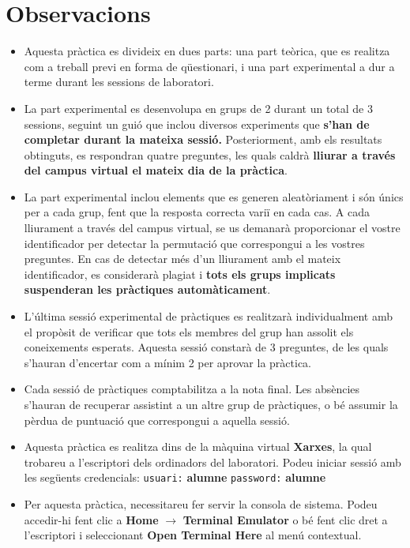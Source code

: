 \documentclass[12pt,a4paper]{article}
\begin{document}
\section*{Observacions}

 \begin{itemize}
 \item Aquesta pràctica es divideix en dues parts: una part teòrica, que es realitza com a treball previ en forma de qüestionari, i una part experimental a dur a terme durant les sessions de laboratori.
 \item La part experimental es desenvolupa en grups de 2 durant un total de 3 sessions, seguint un guió que inclou diversos experiments que \textbf {s'han de completar durant la mateixa sessió.} Posteriorment, amb els resultats obtinguts, es respondran quatre preguntes, les quals caldrà \textbf{lliurar a través del campus virtual el mateix dia de la pràctica}.
\item La part experimental inclou elements que es generen aleatòriament i són únics per a cada grup, fent que la resposta correcta variï en cada cas. A cada lliurament a través del campus virtual, se us demanarà proporcionar el vostre identificador per detectar la permutació que correspongui a les vostres preguntes. En cas de detectar més d'un lliurament amb el mateix identificador, es considerarà plagiat i \textbf{tots els grups implicats suspenderan les pràctiques automàticament}.
\item L'última sessió experimental de pràctiques es realitzarà individualment amb el propòsit de verificar que tots els membres del grup han assolit els coneixements esperats. Aquesta sessió constarà de 3 preguntes, de les quals s'hauran d'encertar com a mínim 2 per aprovar la pràctica.
\item Cada sessió de pràctiques comptabilitza a la nota final. Les absències s'hauran de recuperar assistint a un altre grup de pràctiques, o bé assumir la pèrdua de puntuació que correspongui a aquella sessió.
 \item Aquesta pràctica es realitza dins de la màquina virtual \textbf{Xarxes}, la qual trobareu a l'escriptori dels ordinadors del laboratori. Podeu iniciar sessió amb les següents credencials:
\newline \texttt{usuari:} \textbf{alumne}
\newline \texttt{password:} \textbf{alumne}
\item Per aquesta pràctica, necessitareu fer servir la consola de sistema. Podeu accedir-hi fent clic a \textbf{Home} $\rightarrow$ \textbf{Terminal Emulator} o bé fent clic dret a l'escriptori i seleccionant \textbf{Open Terminal Here} al menú contextual.


\end{itemize}
\end{document}
